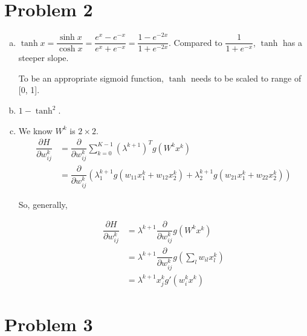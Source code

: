 \documentclass[10pt]{article}
\begin{document}
\section*{Problem 2}
\begin{enumerate}[(a)]

\item  $\tanh x = \dfrac{\sinh x}{\cosh x} = \dfrac{e^x - e^{-x}}{e^x
+ e^{-x}} = \dfrac{1 - e^{-2x}}{1 + e^{-2x}}$. Compared to $\dfrac{1}{1
+ e^{-x}}$, $\tanh$ has a steeper slope.

To be an appropriate sigmoid function, $\tanh$ needs to be scaled to
range of [0, 1].

\item $1 - \tanh^2$.

\item We know $W^k$ is $2 \times 2$.
\begin{align}
\dfrac{\partial H}{\partial w_{ij}^k} &= \dfrac{\partial}{\partial
w_{ij}^k} \sum\limits_{k=0}^{K-1} (\lambda^{k+1})^T g(W^kx^k)\\
&= \dfrac{\partial}{\partial w_{ij}^k} (\lambda_1^{k+1} g(w_{11}x_1^k
+ w_{12}x_2^k) + \lambda_2^{k+1} g(w_{21}x_1^k + w_{22}x_2^k))
\end{align}

So, generally,

\begin{align}
\dfrac{\partial H}{\partial w_{ij}^k} &= \lambda^{k+1}
\dfrac{\partial}{\partial w_{ij}^k} g(W^k x^k)\\
&= \lambda^{k+1} \dfrac{\partial}{\partial w_{ij}^k} g(\sum
\limits_{l}w_{il}x_l^{k}) \\
&= \lambda^{k+1} x_j^k g'(w_i^k x^k)
\end{align}

\end{enumerate}

\section*{Problem 3}
\end{document}
